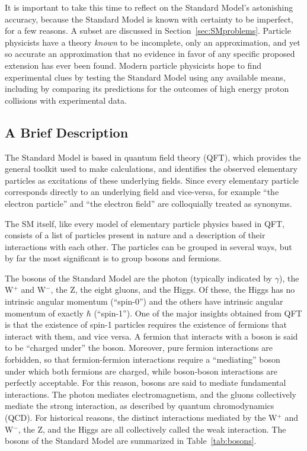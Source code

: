 It is important to take this time to reflect on the Standard Model's astonishing accuracy, because the Standard Model is known with certainty to be imperfect, for a few reasons. 
A subset are discussed in Section~\ref{sec:SMproblems}.
Particle physicists have a theory {\it known} to be incomplete, only an approximation, and yet so accurate an approximation that no evidence in favor of any specific proposed extension has ever been found.
Modern particle physicists hope to find experimental clues by testing the Standard Model using any available means, including by comparing its predictions for the outcomes of high energy proton collisions with experimental data.

  \subsection{A Brief Description} \label{sec:SMdescription}

  The Standard Model is based in quantum field theory (QFT), which provides the general toolkit used to make calculations, and identifies the observed elementary particles as excitations of these underlying fields.
  Since every elementary particle corresponds directly to an underlying field and vice-versa, for example ``the electron particle'' and ``the electron field'' are colloquially treated as synonyms.

  The SM itself, like every model of elementary particle physics based in QFT, consists of a list of particles present in nature and a description of their interactions with each other.
  The particles can be grouped in several ways, but by far the most significant is to group bosons and fermions.

  The bosons of the Standard Model are the photon (typically indicated by $\gamma$), the W$^+$ and W$^-$, the Z, the eight gluons, and the Higgs.
  Of these, the Higgs has no intrinsic angular momentum (``spin-0'') and the others have intrinsic angular momentum of exactly $\hbar$ (``spin-1'').
  One of the major insights obtained from QFT is that the existence of spin-1 particles requires the existence of fermions that interact with them, and vice versa.
  A fermion that interacts with a boson is said to be ``charged under'' the boson.
  Moreover, pure fermion interactions are forbidden, so that fermion-fermion interactions require a ``mediating'' boson under which both fermions are charged, while boson-boson interactions are perfectly acceptable.
  For this reason, bosons are said to mediate fundamental interactions.
  The photon mediates electromagnetism, and the gluons collectively mediate the strong interaction, as described by quantum chromodynamics (QCD).
  For historical reasons, the distinct interactions mediated by the W$^+$ and W$^-$, the Z, and the Higgs are all collectively called the weak interaction.
  The bosons of the Standard Model are summarized in Table~\ref{tab:bosons}.


